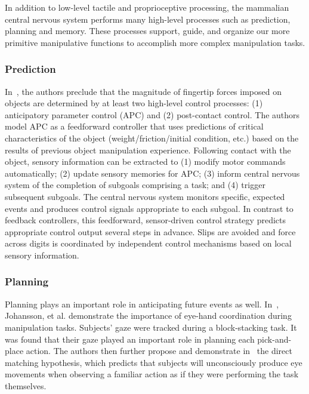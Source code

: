 In addition to low-level tactile and proprioceptive processing, the mammalian central nervous system performs many high-level processes such as prediction, planning and memory.
These processes support, guide, and organize our more primitive manipulative functions to accomplish more complex manipulation tasks.

\subsubsection*{Prediction}

In~\cite{johansson1994grasp}, the authors preclude that the magnitude of fingertip forces imposed on objects are determined by at least two high-level control processes: (1) anticipatory parameter control (APC) and (2) post-contact control.
The authors model APC as a feedforward controller that uses predictions of critical characteristics of the object (weight/friction/initial condition, etc.) based on the results of previous object manipulation experience.
Following contact with the object, sensory information can be extracted to (1) modify motor commands automatically; (2) update sensory memories for APC; (3) inform central nervous system of the completion of subgoals comprising a task; and (4) trigger subsequent subgoals.
The central nervous system monitors specific, expected events and produces control signals appropriate to each subgoal.
In contrast to feedback controllers, this feedforward, sensor-driven control strategy predicts appropriate control output several steps in advance.
Slips are avoided and force across digits is coordinated by independent control mechanisms based on local sensory information.

\subsubsection*{Planning}

Planning plays an important role in anticipating future events as well.
In~\cite{johansson2001eye}, Johansson, et al. demonstrate the importance of eye-hand coordination during manipulation tasks.
Subjects' gaze were tracked during a block-stacking task.
It was found that their gaze played an important role in planning each pick-and-place action.
The authors then further propose and demonstrate in~\cite{flanagan2003action} the direct matching hypothesis, which predicts that subjects will unconsciously produce eye movements when observing a familiar action as if they were performing the task themselves.

